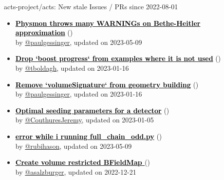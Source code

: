 \begin{frame}[allowframebreaks]{ acts-project/acts: New stale Issues / PRs since 2022-08-01 }
\begin{itemize}
    \item\iss\prstale\textbf{\href{https://github.com/acts-project/acts/issues/1748}{\textcolor{black}{Physmon throws many WARNINGs on Bethe-Heitler approximation}}}
    (\href{https://github.com/acts-project/acts/issues/1748}{}) \\
    by \href{https://github.com/paulgessinger}{@paulgessinger}, updated on 2023-05-09

    \item\iss\prstale\textbf{\href{https://github.com/acts-project/acts/issues/1736}{\textcolor{black}{Drop `boost progress` from examples where it is not used}}}
    (\href{https://github.com/acts-project/acts/issues/1736}{}) \\
    by \href{https://github.com/tboldagh}{@tboldagh}, updated on 2023-01-16

    \item\iss\prstale\textbf{\href{https://github.com/acts-project/acts/issues/1731}{\textcolor{black}{Remove `volumeSignature` from geometry building}}}
    (\href{https://github.com/acts-project/acts/issues/1731}{}) \\
    by \href{https://github.com/paulgessinger}{@paulgessinger}, updated on 2023-01-16

    \item\iss\prstale\textbf{\href{https://github.com/acts-project/acts/issues/1699}{\textcolor{black}{Optimal seeding parameters for a detector}}}
    (\href{https://github.com/acts-project/acts/issues/1699}{}) \\
    by \href{https://github.com/CouthuresJeremy}{@CouthuresJeremy}, updated on 2023-01-05

    \item\iss\prstale\textbf{\href{https://github.com/acts-project/acts/issues/1661}{\textcolor{black}{error while i running full\_chain\_odd.py}}}
    (\href{https://github.com/acts-project/acts/issues/1661}{}) \\
    by \href{https://github.com/rubihason}{@rubihason}, updated on 2023-05-09

    \item\iss\prstale\textbf{\href{https://github.com/acts-project/acts/issues/1659}{\textcolor{black}{Create volume restricted BFieldMap }}}
    (\href{https://github.com/acts-project/acts/issues/1659}{}) \\
    by \href{https://github.com/asalzburger}{@asalzburger}, updated on 2022-12-21


\end{itemize}
\end{frame}
